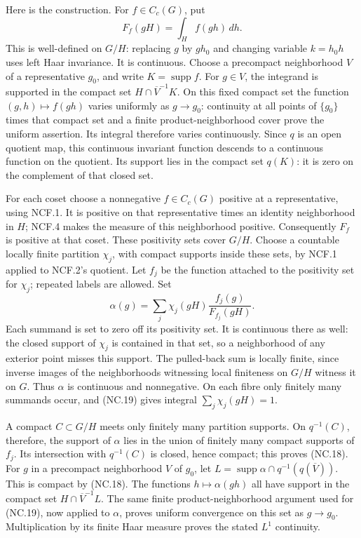 \documentclass[
  11pt,
]{article}
\begin{document}
Here is the construction. For \(f\in C_c(G)\), put \[
 F_f(gH)=\int_H f(gh)\,dh.                                \tag{NC.19}
\] This is well-defined on \(G/H\): replacing \(g\) by \(gh_0\) and
changing variable \(k=h_0h\) uses left Haar invariance. It is
continuous. Choose a precompact neighborhood \(V\) of a representative
\(g_0\), and write \(K=\operatorname{supp}f\). For \(g\in V\), the
integrand is supported in the compact set \(H\cap\overline V^{-1}K\). On
this fixed compact set the function \((g,h)\mapsto f(gh)\) varies
uniformly as \(g\to g_0\): continuity at all points of \(\{g_0\}\) times
that compact set and a finite product-neighborhood cover prove the
uniform assertion. Its integral therefore varies continuously. Since
\(q\) is an open quotient map, this continuous invariant function
descends to a continuous function on the quotient. Its support lies in
the compact set \(q(K)\): it is zero on the complement of that closed
set.

For each coset choose a nonnegative \(f\in C_c(G)\) positive at a
representative, using NCF.1. It is positive on that representative times
an identity neighborhood in \(H\); NCF.4 makes the measure of this
neighborhood positive. Consequently \(F_f\) is positive at that coset.
These positivity sets cover \(G/H\). Choose a countable locally finite
partition \(\chi_j\), with compact supports inside these sets, by NCF.1
applied to NCF.2's quotient. Let \(f_j\) be the function attached to the
positivity set for \(\chi_j\); repeated labels are allowed. Set \[
 \alpha(g)=\sum_j\chi_j(gH)\frac{f_j(g)}{F_{f_j}(gH)}.       \tag{NC.20}
\] Each summand is set to zero off its positivity set. It is continuous
there as well: the closed support of \(\chi_j\) is contained in that
set, so a neighborhood of any exterior point misses this support. The
pulled-back sum is locally finite, since inverse images of the
neighborhoods witnessing local finiteness on \(G/H\) witness it on
\(G\). Thus \(\alpha\) is continuous and nonnegative. On each fibre only
finitely many summands occur, and (NC.19) gives integral
\(\sum_j\chi_j(gH)=1\).

A compact \(C\subset G/H\) meets only finitely many partition supports.
On \(q^{-1}(C)\), therefore, the support of \(\alpha\) lies in the union
of finitely many compact supports of \(f_j\). Its intersection with
\(q^{-1}(C)\) is closed, hence compact; this proves (NC.18). For \(g\)
in a precompact neighborhood \(V\) of \(g_0\), let
\(L=\operatorname{supp}\alpha\cap q^{-1}(q(\overline V))\). This is
compact by (NC.18). The functions \(h\mapsto\alpha(gh)\) all have
support in the compact set \(H\cap\overline V^{-1}L\). The same finite
product-neighborhood argument used for (NC.19), now applied to
\(\alpha\), proves uniform convergence on this set as \(g\to g_0\).
Multiplication by its finite Haar measure proves the stated \(L^1\)
continuity.
\end{document}
